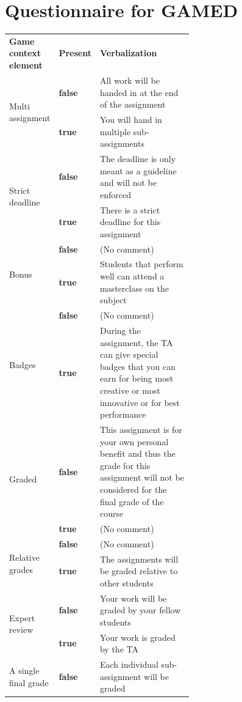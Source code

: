 \documentclass[11pt]{article}
\newcommand{\ra}[1]{\renewcommand{\arraystretch}{#1}}
\begin{document}
\newpage
\section{Questionnaire for GAMED}

\begin{table}[h!t]
  \centering
\ra{1.3}
  \begin{tabular}{ll p{0.6\linewidth}}
\toprule
    \textbf{Game context element} & \textbf{Present} & \textbf{Verbalization} \\ 
\cmidrule{1-2}
\cmidrule{3-3}
    \multirow{2}{*}{Multi assignment} & \textbf{false} & All work will be handed in at the end of the assignment \\
    & \textbf{true} & You will hand in multiple sub-assignments \\ \hline
    \multirow{2}{*}{Strict deadline} & \textbf{false} & The deadline is only meant as a guideline and will not be enforced \\
    & \textbf{true} & There is a strict deadline for this assignment \\ \hline
    \multirow{2}{*}{Bonus} & \textbf{false} & (No comment) \\
    & \textbf{true} & Students that perform well can attend a masterclass on the subject \\ \hline
    \multirow{2}{*}{Badges} & \textbf{false} & (No comment) \\
    & \textbf{true} & During the assignment, the TA can give special badges that you can earn for being most creative or most innovative or for best performance \\ \hline
    \multirow{2}{*}{Graded} & \textbf{false} & This assignment is for your own personal benefit and thus the grade for this assignment will not be considered for the final grade of the course \\
    & \textbf{true} & (No comment) \\ \hline
    \multirow{2}{*}{Relative grades} &  \textbf{false} & (No comment) \\
    & \textbf{true} & The assignments will be graded relative to other students \\ \hline
    \multirow{2}{*}{Expert review} & \textbf{false} & Your work will be graded by your fellow students \\
   & \textbf{true} & Your work is graded by the TA \\ \hline
    \multirow{2}{*}{A single final grade} & \textbf{false} & Each individual sub-assignment will be graded \\

\end{tabular}
\end{table}
\end{document}
